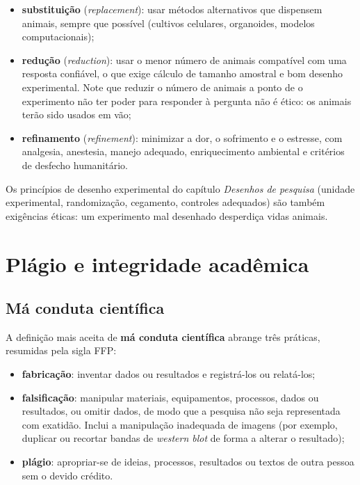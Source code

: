 \documentclass[
]{book}
\providecommand{\tightlist}{%
  \setlength{\itemsep}{0pt}\setlength{\parskip}{0pt}}
\begin{document}
\begin{itemize}
\tightlist
\item
  \textbf{substituição} (\emph{replacement}): usar métodos alternativos que dispensem animais, sempre que possível (cultivos celulares, organoides, modelos computacionais);
\item
  \textbf{redução} (\emph{reduction}): usar o menor número de animais compatível com uma resposta confiável, o que exige cálculo de tamanho amostral e bom desenho experimental. Note que reduzir o número de animais a ponto de o experimento não ter poder para responder à pergunta não é ético: os animais terão sido usados em vão;
\item
  \textbf{refinamento} (\emph{refinement}): minimizar a dor, o sofrimento e o estresse, com analgesia, anestesia, manejo adequado, enriquecimento ambiental e critérios de desfecho humanitário.
\end{itemize}

Os princípios de desenho experimental do capítulo \emph{Desenhos de pesquisa} (unidade experimental, randomização, cegamento, controles adequados) são também exigências éticas: um experimento mal desenhado desperdiça vidas animais.

\section{Plágio e integridade acadêmica}\label{pluxe1gio-e-integridade-acaduxeamica}

\subsection{Má conduta científica}\label{muxe1-conduta-cientuxedfica}

A definição mais aceita de \textbf{má conduta científica} abrange três práticas, resumidas pela sigla FFP:

\begin{itemize}
\tightlist
\item
  \textbf{fabricação}: inventar dados ou resultados e registrá-los ou relatá-los;
\item
  \textbf{falsificação}: manipular materiais, equipamentos, processos, dados ou resultados, ou omitir dados, de modo que a pesquisa não seja representada com exatidão. Inclui a manipulação inadequada de imagens (por exemplo, duplicar ou recortar bandas de \emph{western blot} de forma a alterar o resultado);
\item
  \textbf{plágio}: apropriar-se de ideias, processos, resultados ou textos de outra pessoa sem o devido crédito.
\end{itemize}
\end{document}
